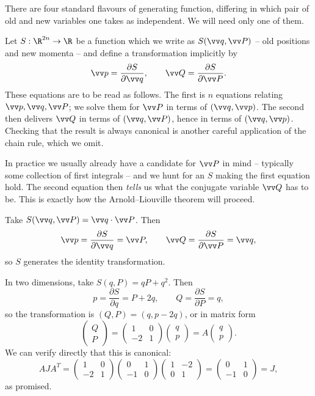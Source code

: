 There are four standard flavours of generating function, differing in which pair of old and new variables one takes as independent. We will need only one of them.

Let $S : \R^{2n}\to\R$ be a function which we write as $S(\vv q, \vv P)$ -- old positions and new momenta -- and define a transformation implicitly by
$$
\vv p = \frac{\partial S}{\partial \vv q}, \qquad \vv Q = \frac{\partial S}{\partial \vv P}.
$$
These equations are to be read as follows. The first is $n$ equations relating $\vv p, \vv q, \vv P$; we solve them for $\vv P$ in terms of $(\vv q, \vv p)$. The second then delivers $\vv Q$ in terms of $(\vv q, \vv P)$, hence in terms of $(\vv q, \vv p)$. Checking that the result is always canonical is another careful application of the chain rule, which we omit.

In practice we usually already have a candidate for $\vv P$ in mind -- typically some collection of first integrals -- and we hunt for an $S$ making the first equation hold. The second equation then \emph{tells} us what the conjugate variable $\vv Q$ has to be. This is exactly how the Arnold--Liouville theorem will proceed.

\begin{example}
	Take $S(\vv q, \vv P) = \vv q\cdot \vv P$. Then
	$$
	\vv p = \frac{\partial S}{\partial \vv q} = \vv P, \qquad \vv Q = \frac{\partial S}{\partial \vv P} = \vv q,
	$$
	so $S$ generates the identity transformation.
\end{example}

\begin{example}
	In two dimensions, take $S(q, P) = qP + q^2$. Then
	$$
	p = \frac{\partial S}{\partial q} = P + 2q, \qquad Q = \frac{\partial S}{\partial P} = q,
	$$
	so the transformation is $(Q,P) = (q, p-2q)$, or in matrix form
	$$
	\begin{pmatrix}Q\\P\end{pmatrix} = \begin{pmatrix}1 & 0\\ -2 & 1\end{pmatrix}\begin{pmatrix}q\\p\end{pmatrix} = A \begin{pmatrix}q\\p\end{pmatrix}.
	$$
	We can verify directly that this is canonical:
	$$
	AJA^T = \begin{pmatrix}1&0\\-2&1\end{pmatrix}\begin{pmatrix}0&1\\-1&0\end{pmatrix}\begin{pmatrix}1&-2\\0&1\end{pmatrix} = \begin{pmatrix}0&1\\-1&0\end{pmatrix} = J,
	$$
	as promised.
\end{example}

